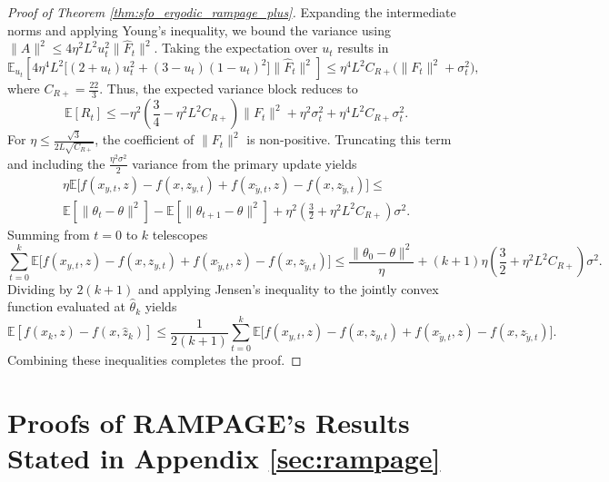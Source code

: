 \documentclass[letter,11pt]{article}
\begin{document}
\begin{proof}[Proof of Theorem \ref{thm:sfo_ergodic_rampage_plus}]
Expanding the intermediate norms and applying Young's inequality, we bound the variance using $\|A\|^2 \le 4\eta^2 L^2 u_t^2 \|\hat{F}_t\|^2$. Taking the expectation over $u_t$ results in
\begin{equation}
\mathbb{E}_{u_t} \left[ 4\eta^4 L^2 \big[ (2+u_t)u_t^2 + (3-u_t)(1-u_t)^2 \big] \|\hat{F}_t\|^2 \right] \le \eta^4 L^2 C_{R+} \big(\|F_t\|^2 + \sigma_t^2\big),
\end{equation}
where $C_{R+} = \frac{22}{3}$. Thus, the expected variance block reduces to
\begin{equation}
\mathbb{E}[R_t] \le -\eta^2 \left( \frac{3}{4} - \eta^2 L^2 C_{R+} \right) \|F_t\|^2 + \eta^2 \sigma_t^2 + \eta^4 L^2 C_{R+} \sigma_t^2.
\end{equation}
For $\eta \le \frac{\sqrt{3}}{2L\sqrt{C_{R+}}}$, the coefficient of $\|F_t\|^2$ is non-positive. Truncating this term and including the $\frac{\eta^2 \sigma^2}{2}$ variance from the primary update yields
\begin{equation}
\begin{aligned}
\eta \mathbb{E} \big[ f(x_{y,t}, z) - f(x, z_{y,t}) + f(x_{\tilde{y},t}, z) - f(x, z_{\tilde{y},t}) \big] \le \\
\mathbb{E} \left[ \|\theta_t - \theta\|^2 \right] - \mathbb{E} \left[ \|\theta_{t+1} - \theta\|^2 \right] + \eta^2 \left( \frac{3}{2} + \eta^2 L^2 C_{R+} \right) \sigma^2.
\end{aligned}
\end{equation}
Summing from $t=0$ to $k$ telescopes
\begin{equation}
\sum_{t=0}^k \mathbb{E} \big[ f(x_{y,t}, z) - f(x, z_{y,t}) + f(x_{\tilde{y},t}, z) - f(x, z_{\tilde{y},t}) \big] \le \frac{\|\theta_0 - \theta\|^2}{\eta} + (k+1)\eta \left( \frac{3}{2} + \eta^2 L^2 C_{R+} \right) \sigma^2.
\end{equation}
Dividing by $2(k+1)$ and applying Jensen's inequality to the jointly convex function evaluated at $\hat{\theta}_k$ yields
\begin{equation}
\mathbb{E} \left[ f(\hat{x}_k, z) - f(x, \hat{z}_k) \right] \le \frac{1}{2(k+1)} \sum_{t=0}^k \mathbb{E} \big[ f(x_{y,t}, z) - f(x, z_{y,t}) + f(x_{\tilde{y},t}, z) - f(x, z_{\tilde{y},t}) \big].
\end{equation}
Combining these inequalities completes the proof.
\end{proof}
\section{Proofs of RAMPAGE's Results Stated in Appendix \ref{sec:rampage}}
\end{document}
